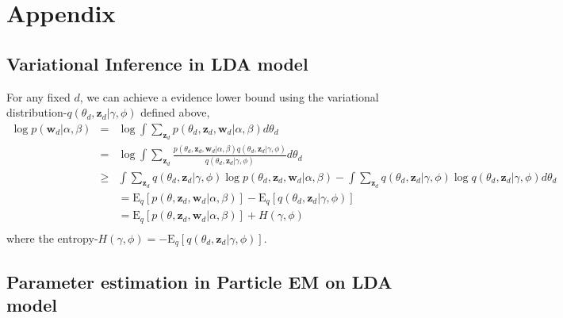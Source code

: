 \documentclass{article}
\newcommand{\be}{\begin{equation}}
\newcommand{\ee}{\end{equation}}
\newcommand{\bs}{\boldsymbol}
\newcommand{\ba}{\begin{array}}
\newcommand{\ea}{\end{array}}
\newcommand{\E}{\mathrm{E}}
\newcommand{\Sum}{\displaystyle\sum}
\begin{document}
\section{Appendix}
\subsection{Variational Inference in LDA model}
For any fixed $d$, we can achieve a evidence lower bound using the variational distribution-$q(\theta_d,\bs{z}_d|\gamma,\phi)$ defined above,\\
\be\label{elbo1}
\ba{rcl}
\log p(\bs{w}_d|\alpha,\beta)&=&\log\int\Sum_{
	\bs{z}_d}p(\theta_d,\bs{z}_d,\bs{w}_d|\alpha,\beta)d\theta_d\\
&=&\log\int\Sum_{
	\bs{z}_d}\frac{p(\theta_d,\bs{z}_d,\bs{w}_d|\alpha,\beta)q(\theta_d,\bs{z}_d|\gamma,\phi)}{q(\theta_d,\bs{z}_d|\gamma,\phi)}d\theta_d\\
&\ge&\int\Sum_{
	\bs{z}_d}q(\theta_d,\bs{z}_d|\gamma,\phi)\log p(\theta_d,\bs{z}_d,\bs{w}_d|\alpha,\beta)-\int\Sum_{
	\bs{z}_d}q(\theta_d,\bs{z}_d|\gamma,\phi)\log q(\theta_d,\bs{z}_d|\gamma,\phi)d\theta_d\\
&&=\E_{q}[p(\theta,\bs{z}_d,\bs{w}_d|\alpha,\beta)]-\E_{q}[q(\theta_d,\bs{z}_d|\gamma,\phi)]\\
&&=\E_{q}[p(\theta,\bs{z}_d,\bs{w}_d|\alpha,\beta)]+H(\gamma,\phi)\\
\ea
\ee
where the entropy-$H(\gamma,\phi)=-\E_{q}[q(\theta_d,\bs{z}_d|\gamma,\phi)]$.
\subsection {Parameter estimation in Particle EM on LDA model}
\end{document}
